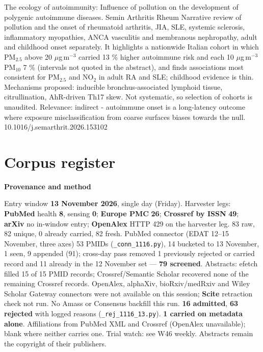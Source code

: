 \documentclass[10pt]{article}
\begin{document}
{The ecology of autoimmunity: Influence of pollution on the development of polygenic autoimmune diseases.}
{Semin Arthritis Rheum}
{Narrative review of pollution and the onset of rheumatoid arthritis, JIA, SLE, systemic sclerosis, inflammatory myopathies, ANCA vasculitis and membranous nephropathy, adult and childhood onset separately. It highlights a nationwide Italian cohort in which PM$_{2.5}$ above 20 $\mu$g\,m$^{-3}$ carried 13 \% higher autoimmune risk and each 10 $\mu$g\,m$^{-3}$ PM$_{10}$ 7 \% (intervals not quoted in the abstract), and finds associations most consistent for PM$_{2.5}$ and NO$_2$ in adult RA and SLE; childhood evidence is thin. Mechanisms proposed: inducible bronchus-associated lymphoid tissue, citrullination, AhR-driven Th17 skew. Not systematic, so selection of cohorts is unaudited. Relevance: indirect - autoimmune onset is a long-latency outcome where exposure misclassification from coarse surfaces biases towards the null.}
{10.1016/j.semarthrit.2026.153102}

\clearpage
\section*{\sffamily\bfseries\color{Deep}Corpus register}
\vspace{-1.5mm}{\color{Amber}\rule{\linewidth}{1.1pt}}\vspace{2.5mm}



\vspace{2mm}

\begin{keybox}
{\sffamily\bfseries\footnotesize\color{Deep}Provenance and method}\\[1.2mm]
{\fontsize{7.2}{8.8}\selectfont
Entry window \textbf{13 November 2026}, single day (Friday). Harvester legs: \textbf{PubMed} health \textbf{8}, sensing \textbf{0}; \textbf{Europe PMC} \textbf{26}; \textbf{Crossref by ISSN} \textbf{49}; \textbf{arXiv} no in-window entry; \textbf{OpenAlex} HTTP 429 on the harvester leg. 83 raw, 82 unique, 0 already carried, 82 fresh. PubMed connector (EDAT 12--15 November, three axes) 53 PMIDs (\texttt{\_conn\_1116.py}), 14 bucketed to 13 November, 1 seen, 9 appended (91); cross-day pass removed 1 previously rejected or carried record and 11 already in the 12 November set --- \textbf{79 screened}. Abstracts: efetch filled 15 of 15 PMID records; Crossref/Semantic Scholar recovered none of the remaining Crossref records.
OpenAlex, alphaXiv, bioRxiv/medRxiv and Wiley Scholar Gateway connectors were not available on this session; \textbf{Scite} retraction check not run. No Amass or Consensus backfill this run.
\textbf{16 admitted}, \textbf{63 rejected} with logged reasons (\texttt{\_rej\_1116\_13.py}). \textbf{1 carried on metadata alone}. Affiliations from PubMed XML and Crossref (OpenAlex unavailable); blank where neither carries one. Trial watch: see W46 weekly.
Abstracts remain the copyright of their publishers.\par}
\end{keybox}
\end{document}
